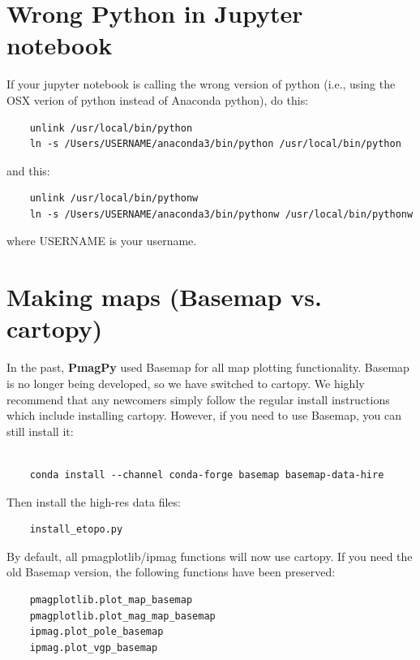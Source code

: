 \documentclass[11pt]{book}
\begin{document}
{{\section{Wrong Python in Jupyter notebook}

If your jupyter notebook is calling the wrong version of python (i.e., using the OSX verion of python instead of Anaconda python), do this:

\begin{verbatim}
    unlink /usr/local/bin/python
    ln -s /Users/USERNAME/anaconda3/bin/python /usr/local/bin/python

\end{verbatim}
    and this:

\begin{verbatim}
    unlink /usr/local/bin/pythonw
    ln -s /Users/USERNAME/anaconda3/bin/pythonw /usr/local/bin/pythonw
\end{verbatim}

where USERNAME is your username.


\section{Making maps (Basemap vs. cartopy)}

In the past, {\bf PmagPy} used Basemap for all map plotting functionality.  Basemap is no longer being developed, so we have switched to cartopy.  We highly recommend that any newcomers simply follow the regular install instructions which include installing cartopy.  However, if you need to use Basemap, you can still install it:

\begin{verbatim}

    conda install --channel conda-forge basemap basemap-data-hire
\end{verbatim}

Then install the high-res data files:

\begin{verbatim}
    install_etopo.py
\end{verbatim}

By default, all pmagplotlib/ipmag functions will now use cartopy.  If you need the old Basemap version, the following functions have been preserved:

\begin{verbatim}
    pmagplotlib.plot_map_basemap
    pmagplotlib.plot_mag_map_basemap
    ipmag.plot_pole_basemap
    ipmag.plot_vgp_basemap
\end{verbatim}

}}
\end{document}
